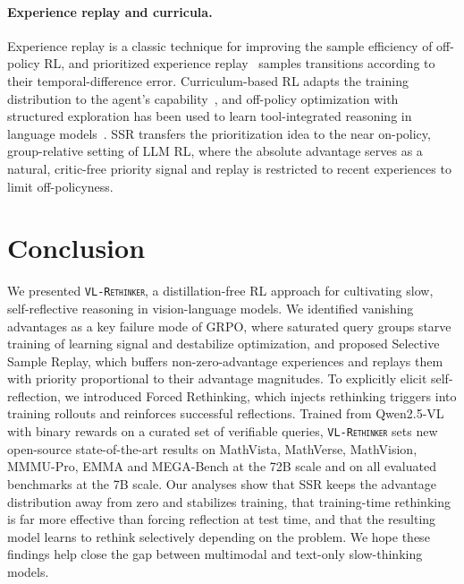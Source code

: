 \documentclass{article}
\newcommand{\model}{\texttt{\textsc{VL-Rethinker}}\xspace}
\begin{document}
\paragraph{Experience replay and curricula.} Experience replay is a classic technique for improving the sample efficiency of off-policy RL, and prioritized experience replay~\citep{per} samples transitions according to their temporal-difference error. Curriculum-based RL adapts the training distribution to the agent's capability~\citep{curriculum}, and off-policy optimization with structured exploration has been used to learn tool-integrated reasoning in language models~\citep{wang2025learning}. SSR transfers the prioritization idea to the near on-policy, group-relative setting of LLM RL, where the absolute advantage serves as a natural, critic-free priority signal and replay is restricted to recent experiences to limit off-policyness.

\section{Conclusion}
\label{sec:conclusion}

We presented \model, a distillation-free RL approach for cultivating slow, self-reflective reasoning in vision-language models. We identified vanishing advantages as a key failure mode of GRPO, where saturated query groups starve training of learning signal and destabilize optimization, and proposed Selective Sample Replay, which buffers non-zero-advantage experiences and replays them with priority proportional to their advantage magnitudes. To explicitly elicit self-reflection, we introduced Forced Rethinking, which injects rethinking triggers into training rollouts and reinforces successful reflections. Trained from Qwen2.5-VL with binary rewards on a curated set of verifiable queries, \model sets new open-source state-of-the-art results on MathVista, MathVerse, MathVision, MMMU-Pro, EMMA and MEGA-Bench at the 72B scale and on all evaluated benchmarks at the 7B scale. Our analyses show that SSR keeps the advantage distribution away from zero and stabilizes training, that training-time rethinking is far more effective than forcing reflection at test time, and that the resulting model learns to rethink selectively depending on the problem. We hope these findings help close the gap between multimodal and text-only slow-thinking models.




\end{document}
